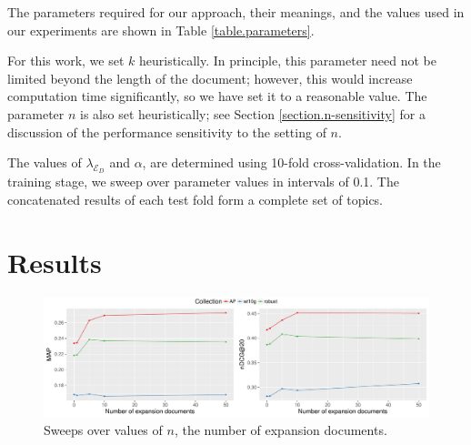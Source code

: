 \documentclass{sig-alternate}
\begin{document}
The parameters required for our approach, their meanings, and the values used in our experiments are shown in Table \ref{table.parameters}. 

For this work, we set $k$ heuristically. In principle, this parameter need not be limited beyond the length of the document; however, this would increase computation time significantly, so we have set it to a reasonable value. The parameter $n$ is also set heuristically; see Section \ref{section.n-sensitivity} for a discussion of the performance sensitivity to the setting of $n$.

The values of $\lambda_{\mathcal{E}_D}$ and $\alpha$, are determined using 10-fold cross-validation. In the training stage, we sweep over parameter values in intervals of 0.1. The concatenated results of each test fold form a complete set of topics.

\section{Results}\label{section.results}

\begin{figure}
\centering
\includegraphics[width=\linewidth]{figures/expansion-sweep.pdf}
\caption{Sweeps over values of $n$, the number of expansion documents.}
\label{figure.n-sweeps}
\end{figure}
\end{document}
